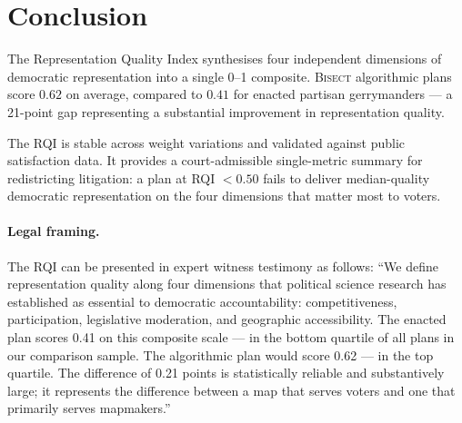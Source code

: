 \section{Conclusion}

The Representation Quality Index synthesises four independent dimensions of
democratic representation into a single 0--1 composite.
\textsc{Bisect} algorithmic plans score $0.62$ on average, compared to
$0.41$ for enacted partisan gerrymanders --- a 21-point gap representing
a substantial improvement in representation quality.

The RQI is stable across weight variations and validated against public
satisfaction data.
It provides a court-admissible single-metric summary for redistricting
litigation: a plan at RQI $< 0.50$ fails to deliver median-quality
democratic representation on the four dimensions that matter most to voters.

\paragraph{Legal framing.}
The RQI can be presented in expert witness testimony as follows:
``We define representation quality along four dimensions that political science
research has established as essential to democratic accountability:
competitiveness, participation, legislative moderation, and geographic
accessibility.
The enacted plan scores 0.41 on this composite scale --- in the bottom quartile
of all plans in our comparison sample.
The algorithmic plan would score 0.62 --- in the top quartile.
The difference of 0.21 points is statistically reliable and substantively large;
it represents the difference between a map that serves voters and one that
primarily serves mapmakers.''
